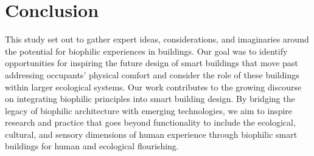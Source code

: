 \section{Conclusion}
\label{sec:ch4-conclusion}
This study set out to gather expert ideas, considerations, and imaginaries around the potential for biophilic experiences in buildings. Our goal was to identify opportunities for inspiring the future design of smart buildings that move past addressing occupants' physical comfort and consider the role of these buildings within larger ecological systems. Our work contributes to the growing discourse on integrating biophilic principles into smart building design. By bridging the legacy of biophilic architecture with emerging technologies, we aim to inspire research and practice that goes beyond functionality to include the ecological, cultural, and sensory dimensions of human experience through biophilic smart buildings for human and ecological flourishing.





